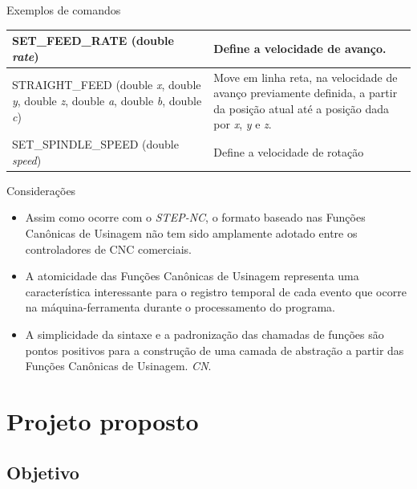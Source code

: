 \documentclass[aspectratio=169]{beamer}
\begin{document}
{\begin{frame}{Exemplos de comandos}
\begin{table}[H]
\begin{tabular}{p{7cm}|p{5cm}}
      \hline  
      \scriptsize{SET\_FEED\_RATE (double \emph{rate})}
      & \scriptsize{Define a velocidade de avan\c co.} \\

      \hline  
      \scriptsize{STRAIGHT\_FEED (double \emph{x}, double \emph{y}, double \emph{z}, 
      double \emph{a}, double \emph{b}, double \emph{c})} 
      & \scriptsize{Move em linha reta, na velocidade de avan\c co previamente definida, 
      a partir da posi\c c\~ao atual at\'e a 
      posi\c c\~ao dada por \emph{x}, \emph{y} e \emph{z}.} \\

      \hline  
      \scriptsize{SET\_SPINDLE\_SPEED (double \emph{speed})} 
      & \scriptsize{Define a velocidade de rotação} \\

      \hline

    \end{tabular}
  \end{table}
\end{frame}


\begin{frame}{Considerações}

  \begin{itemize}
    \item Assim como ocorre com o \emph{STEP-NC}, o formato baseado nas 
          Funções Canônicas de Usinagem não tem sido amplamente adotado 
          entre os controladores de CNC comerciais.
    \item A atomicidade das Funções Canônicas de Usinagem representa uma 
          característica interessante para o registro temporal de cada 
          evento que ocorre na máquina-ferramenta durante o processamento 
          do programa.
    \item A simplicidade da sintaxe e a padronização das chamadas de 
          funções são pontos positivos para a construção de uma camada 
          de abstração a partir das Funções Canônicas de Usinagem.
    \emph{CN}.

  \end{itemize}

\end{frame}


\section{Projeto proposto}

\subsection{Objetivo}

}
\end{document}
